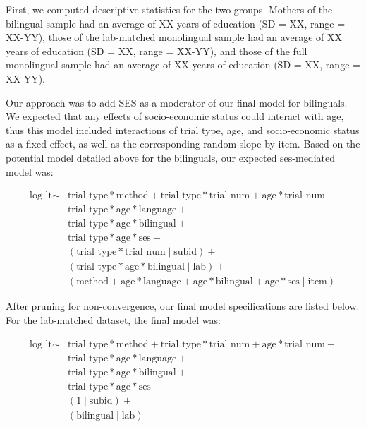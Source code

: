 \documentclass[,man,floatsintext]{apa6}
\begin{document}
First, we computed descriptive statistics for the two groups. Mothers of the bilingual sample had an average of XX years of education (SD = XX, range = XX-YY), those of the lab-matched monolingual sample had an average of XX years of education (SD = XX, range = XX-YY), and those of the full monolingual sample had an average of XX years of education (SD = XX, range = XX-YY).

Our approach was to add SES as a moderator of our final model for bilinguals. We expected that any effects of socio-economic status could interact with age, thus this model included interactions of trial type, age, and socio-economic status as a fixed effect, as well as the corresponding random slope by item. Based on the potential model detailed above for the bilinguals, our expected ses-mediated model was:

\begin{equation}
\begin{split}
\text{log lt} \sim & \text{trial type} * \text{method} + \text{trial type} * \text{trial num} + \text{age} * \text{trial num} + \\
& \text{trial type} * \text{age} * \text{language} + \\
& \text{trial type} * \text{age} * \text{bilingual} + \\
& \text{trial type} * \text{age} * \text{ses} + \\
& (\text{trial type} * \text{trial num} \mid \text{subid}) + \\
& (\text{trial type} * \text{age} * \text{bilingual} \mid \text{lab}) + \\
& (\text{method} + \text{age} * \text{language} + \text{age} * \text{bilingual} +
\text{age} * \text{ses} \mid \text{item})
\end{split}
\end{equation}

After pruning for non-convergence, our final model specifications are listed below. For the lab-matched dataset, the final model was:

\begin{equation}
\begin{split}
\text{log lt} \sim & \text{trial type} * \text{method} + \text{trial type} * \text{trial num} + \text{age} * \text{trial num} + \\
& \text{trial type} * \text{age} * \text{language} + \\
& \text{trial type} * \text{age} * \text{bilingual} + \\
& \text{trial type} * \text{age} * \text{ses} + \\
& (1 \mid \text{subid}) + \\
& (\text{bilingual} \mid \text{lab}) 
\end{split}
\end{equation}
\end{document}
